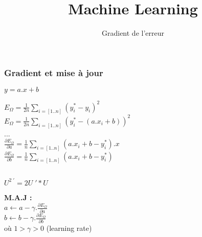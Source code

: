 \documentclass{formation}
\title{Machine Learning}
\subtitle{Gradient de l'erreur}
\begin{document}
\maketitle

\begin{frame}
  \frametitle{Gradient et mise à jour}
  \begin{minipage}[l]{0.49\linewidth}
    \begin{center}
      $\boxed{y = a.x+b}$ \\
    \end{center}
    $E_{\Omega} = \frac{1}{2n}\sum_{i=[1..n]}( y_i^* - y_i )^2$ \\
    $E_{\Omega} = \frac{1}{2n}\sum_{i=[1..n]}( y_i^* - (a.x_i+b) )^2$ \\
    ... \\
    $\frac{\partial{E_{\Omega}}}{\partial{a}} = \frac{1}{n}\sum_{i=[1..n]}(a.x_i+b - y_i^*).x$ \\
    $\frac{\partial{E_{\Omega}}}{\partial{b}} = \frac{1}{n}\sum_{i=[1..n]}(a.x_i+b - y_i^*)$ \\
  \end{minipage}\hfill
  \begin{minipage}[c]{0.49\linewidth}
    $\;$ \\
    $\;$ \\
    $\;$ \\
    \begin{center}
      $\boxed{U^{2\;\prime}=2U\;'*U}$
    \end{center}
  \end{minipage}\hfill
  \begin{center}
    \textbf{M.A.J :} \\
    $\;$ \\
    $a \leftarrow a - \gamma.\frac{\partial{E_{\Omega}}}{\partial{a}}$ \\
    $b \leftarrow b - \gamma.\frac{\partial{E_{\Omega}}}{\partial{b}}$ \\
    $\;$ \\
    où $1 > \gamma > 0$ (learning rate)
  \end{center}
\end{frame}
\end{document}
